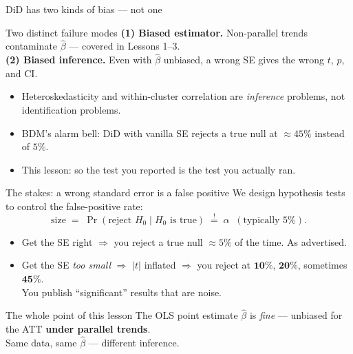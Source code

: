 \documentclass[aspectratio=169,11pt]{beamer}
\begin{document}
\begin{frame}{DiD has two kinds of bias --- not one}
\vspace{0.4em}
\vspace{0.4em}
\begin{block}{Two distinct failure modes}
\small
\textbf{(1) Biased estimator.} Non-parallel trends contaminate $\hat\beta$ --- covered in Lessons 1--3. \\[0.2em]
\textbf{(2) Biased inference.} Even with $\hat\beta$ unbiased, a wrong SE gives the wrong $t$, $p$, and CI.
\end{block}
\vspace{0.3em}
\begin{itemize}\small
  \item Heteroskedasticity and within-cluster correlation are \textit{inference} problems, not identification problems.
  \item BDM's alarm bell: DiD with vanilla SE rejects a true null at $\approx 45\%$ instead of $5\%$.
  \item This lesson:  so the test you reported is the test you actually ran.
\end{itemize}
\end{frame}

\begin{frame}{The stakes: a wrong standard error is a false positive}
\vspace{0.4em}
We design hypothesis tests to control the false-positive rate:
\vspace{-0.1em}
\[
\text{size} \;=\; \Pr(\text{reject } H_0 \mid H_0 \text{ is true}) \;\stackrel{!}{=}\; \alpha \;\;(\text{typically } 5\%).
\]
\vspace{-0.4em}
\begin{itemize}\small
  \item Get the SE right $\Rightarrow$ you reject a true null $\approx 5\%$ of the time. As advertised.
  \item Get the SE \textit{too small} $\Rightarrow$ $|t|$ inflated $\Rightarrow$ you reject at $\mathbf{10\%}$, $\mathbf{20\%}$, sometimes $\mathbf{45\%}$. \\
        You publish ``significant'' results that are noise.
\end{itemize}
\vspace{0.4em}
\begin{block}{The whole point of this lesson}
\small
The OLS point estimate $\hat\beta$ is \textit{fine} --- unbiased for the ATT \textbf{under parallel trends}. \\
 \;Same data, same $\hat\beta$ --- different inference.
\end{block}
\end{frame}
\end{document}
